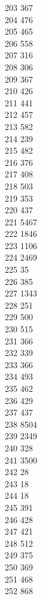 { 203	367 \\
 204	476 \\
 205	465 \\
 206	558 \\
 207	316 \\
 208	306 \\
 209	367 \\
 210	426 \\
 211	441 \\
 212	457 \\
 213	582 \\
 214	239 \\
 215	482 \\
 216	376 \\
 217	408 \\
 218	503 \\
 219	353 \\
 220	437 \\
 221	5467 \\
 222	1846 \\
 223	1106 \\
 224	2469 \\
 225	35 \\
 226	385 \\
 227	1343 \\
 228	251 \\
 229	500 \\
 230	515 \\
 231	366 \\
 232	339 \\
 233	366 \\
 234	493 \\
 235	462 \\
 236	429 \\
 237	437 \\
 238	8504 \\
 239	2349 \\
 240	328 \\
 241	3500 \\
 242	28 \\
 243	18 \\
 244	18 \\
 245	391 \\
 246	428 \\
 247	421 \\
 248	512 \\
 249	375 \\
 250	369 \\
 251	468 \\
 252	868 \\
}
